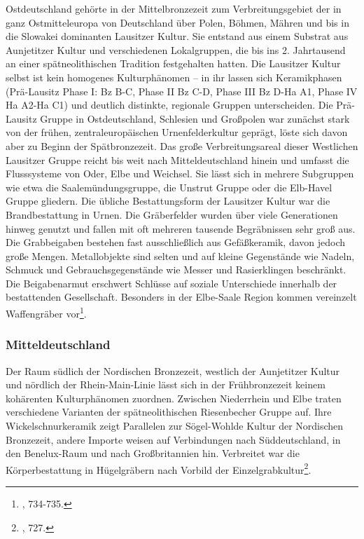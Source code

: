 \documentclass[openany,twoside,twocolumn]{book}
\let\rmarkdownfootnote\footnote%
\def\footnote{\protect\rmarkdownfootnote}
\begin{document}
Ostdeutschland gehörte in der Mittelbronzezeit zum Verbreitungsgebiet
der in ganz Ostmitteleuropa von Deutschland über Polen, Böhmen, Mähren
und bis in die Slowakei dominanten Lausitzer Kultur. Sie entstand aus
einem Substrat aus Aunjetitzer Kultur und verschiedenen Lokalgruppen,
die bis ins 2. Jahrtausend an einer spätneolithischen Tradition
festgehalten hatten. Die Lausitzer Kultur selbst ist kein homogenes
Kulturphänomen -- in ihr lassen sich Keramikphasen (Prä-Lausitz Phase I:
Bz B-C, Phase II Bz C-D, Phase III Bz D-Ha A1, Phase IV Ha A2-Ha C1) und
deutlich distinkte, regionale Gruppen unterscheiden. Die Prä-Lausitz
Gruppe in Ostdeutschland, Schlesien und Großpolen war zunächst stark von
der frühen, zentraleuropäischen Urnenfelderkultur geprägt, löste sich
davon aber zu Beginn der Spätbronzezeit. Das große Verbreitungsareal
dieser Westlichen Lausitzer Gruppe reicht bis weit nach
Mitteldeutschland hinein und umfasst die Flusssysteme von Oder, Elbe und
Weichsel. Sie lässt sich in mehrere Subgruppen wie etwa die
Saalemündungsgruppe, die Unstrut Gruppe oder die Elb-Havel Gruppe
gliedern. Die übliche Bestattungsform der Lausitzer Kultur war die
Brandbestattung in Urnen. Die Gräberfelder wurden über viele
Generationen hinweg genutzt und fallen mit oft mehreren tausende
Begräbnissen sehr groß aus. Die Grabbeigaben bestehen fast
ausschließlich aus Gefäßkeramik, davon jedoch große Mengen.
Metallobjekte sind selten und auf kleine Gegenstände wie Nadeln, Schmuck
und Gebrauchsgegenstände wie Messer und Rasierklingen beschränkt. Die
Beigabenarmut erschwert Schlüsse auf soziale Unterschiede innerhalb der
bestattenden Gesellschaft. Besonders in der Elbe-Saale Region kommen
vereinzelt Waffengräber vor\footnote{\textcite{jockenhovel_germany_2013},
  734-735.}.

\hypertarget{mitteldeutschland}{%
\subsubsection{Mitteldeutschland}\label{mitteldeutschland}}

Der Raum südlich der Nordischen Bronzezeit, westlich der Aunjetitzer
Kultur und nördlich der Rhein-Main-Linie lässt sich in der
Frühbronzezeit keinem kohärenten Kulturphänomen zuordnen. Zwischen
Niederrhein und Elbe traten verschiedene Varianten der spätneolithischen
Riesenbecher Gruppe auf. Ihre Wickelschnurkeramik zeigt Parallelen zur
Sögel-Wohlde Kultur der Nordischen Bronzezeit, andere Importe weisen auf
Verbindungen nach Süddeutschland, in den Benelux-Raum und nach
Großbritannien hin. Verbreitet war die Körperbestattung in Hügelgräbern
nach Vorbild der Einzelgrabkultur\footnote{\textcite{jockenhovel_germany_2013},
  727.}.
\end{document}
